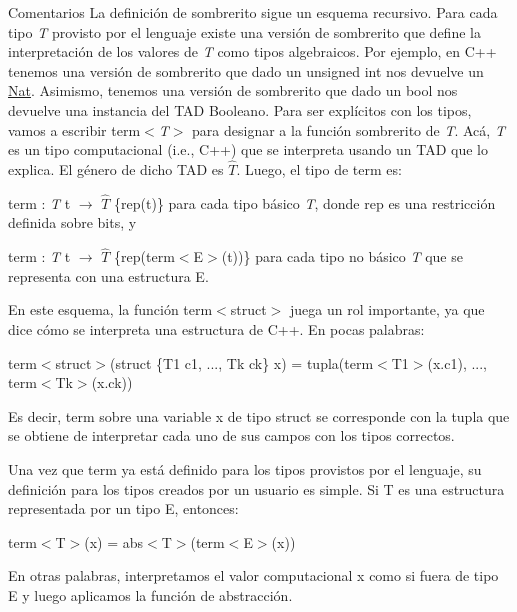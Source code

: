 \begin{DoxyRemark}{Comentarios}
La definición de sombrerito sigue un esquema recursivo. Para cada tipo {\itshape T} provisto por el lenguaje existe una versión de sombrerito que define la interpretación de los valores de {\itshape T} como tipos algebraicos. Por ejemplo, en C++ tenemos una versión de sombrerito que dado un unsigned int nos devuelve un \hyperlink{classNat}{Nat}. Asimismo, tenemos una versión de sombrerito que dado un bool nos devuelve una instancia del T\-A\-D Booleano. Para ser explícitos con los tipos, vamos a escribir term$<${\itshape T$>$} para designar a la función sombrerito de {\itshape T}. Acá, {\itshape T} es un tipo computacional (i.\-e., C++) que se interpreta usando un T\-A\-D que lo explica. El género de dicho T\-A\-D es $\widehat{T}$. Luego, el tipo de term es\-:
\begin{DoxyEnumerate}
\item term \-: {\itshape T} t $\to$ $\widehat{T}$ \{rep(t)\} para cada tipo básico {\itshape T}, donde rep es una restricción definida sobre bits, y
\item term \-: {\itshape T} t $\to$ $\widehat{T}$ \{rep(term$<$\-E$>$(t))\} para cada tipo no básico {\itshape T} que se representa con una estructura E.
\end{DoxyEnumerate}

En este esquema, la función term$<$struct$>$ juega un rol importante, ya que dice cómo se interpreta una estructura de C++. En pocas palabras\-:
\begin{DoxyItemize}
\item term$<$struct$>$(struct \{T1 c1, ..., Tk ck\} x) = tupla(term$<$\-T1$>$(x.\-c1), ..., term$<$\-Tk$>$(x.\-ck))
\end{DoxyItemize}

Es decir, term sobre una variable x de tipo struct se corresponde con la tupla que se obtiene de interpretar cada uno de sus campos con los tipos correctos.

Una vez que term ya está definido para los tipos provistos por el lenguaje, su definición para los tipos creados por un usuario es simple. Si T es una estructura representada por un tipo E, entonces\-:
\begin{DoxyItemize}
\item term$<$\-T$>$(x) = abs$<$\-T$>$(term$<$\-E$>$(x))
\end{DoxyItemize}

En otras palabras, interpretamos el valor computacional x como si fuera de tipo E y luego aplicamos la función de abstracción. 
\end{DoxyRemark}


